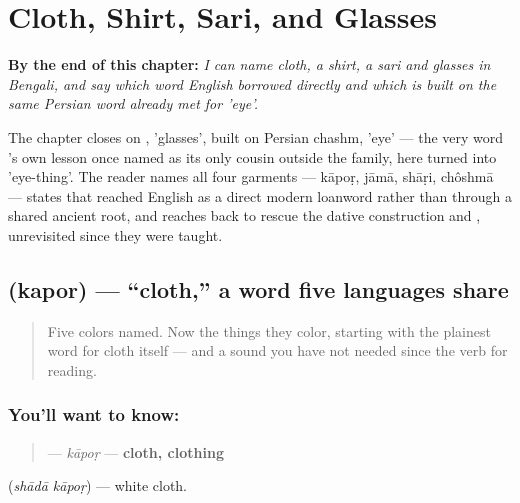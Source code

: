 
\chapter{Cloth, Shirt, Sari, and Glasses}
\label{ch:bn-cloth-shirt-sari-glasses}

\begin{chapteropening}
\textbf{By the end of this chapter:} \emph{I can name cloth, a shirt, a sari and glasses in Bengali, and say which word English borrowed directly and which is built on the same Persian word already met for 'eye'.}

The chapter closes on , 'glasses', built on Persian chashm, 'eye' — the very word 's own lesson once named as its only cousin outside the family, here turned into 'eye-thing'. The reader names all four garments — kāpoṛ, jāmā, shāṛi, chôshmā — states that  reached English as a direct modern loanword rather than through a shared ancient root, and reaches back to rescue the dative construction and , unrevisited since they were taught.
\end{chapteropening}

\section[kapor]{ (kapor) — \textquotedblleft{}cloth,\textquotedblright{} a word five languages share}

\label{lesson:BN-C15-kapor}



\begin{quote}
Five colors named. Now the things they color, starting with the plainest word for cloth itself — and a sound you have not needed since the verb for reading.
\end{quote}

\subsection*{You'll want to know: }
\begin{quote}
\textbf{} — \emph{kāpoṛ} — \textbf{cloth, clothing}
\end{quote}

  (\emph{shādā kāpoṛ}) — white cloth.

